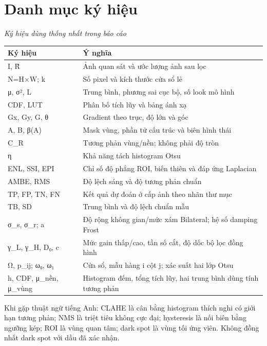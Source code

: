 \documentclass[13pt,a4paper]{extreport}
\begin{document}
\section*{Danh mục ký hiệu}
\noindent\textit{Ký hiệu dùng thống nhất trong báo cáo}
\begin{longtable}{p{7.3cm}|p{7.3cm}}
Ký hiệu & Ý nghĩa\\\hline
I, R̂ & Ảnh quan sát và ước lượng ảnh sau lọc\\\hline
N=H×W; k & Số pixel và kích thước cửa sổ lẻ\\\hline
μ, σ², L & Trung bình, phương sai cục bộ, số look mô hình\\\hline
CDF, LUT & Phân bố tích lũy và bảng ánh xạ\\\hline
Gx, Gy, G, θ & Gradient theo trục, độ lớn và góc\\\hline
A, B, β(A) & Mask vùng, phần tử cấu trúc và biên hình thái\\\hline
C\_R & Tương phản vùng/nền; không phải độ tròn\\\hline
η & Khả năng tách histogram Otsu\\\hline
ENL, SSI, EPI & Chỉ số độ phẳng ROI, biến thiên và đáp ứng Laplacian\\\hline
AMBE, RMS & Độ lệch sáng và độ tương phản chuẩn\\\hline
TP, FP, TN, FN & Kết quả dự đoán ở cấp ảnh theo nhãn thư mục\\\hline
TB, SD & Trung bình và độ lệch chuẩn mẫu\\\hline
σ\_s, σ\_r; a & Độ rộng không gian/mức xám Bilateral; hệ số damping Frost\\\hline
γ\_L, γ\_H, D₀, c & Mức gain thấp/cao, tần số cắt, độ dốc bộ lọc đồng hình\\\hline
Ω, p\_ij; ω₀, ω₁ & Cửa sổ, mẫu hàng i cột j; xác suất hai lớp Otsu\\\hline
h, CDF, μ\_nền, μ\_vùng & Histogram đếm, tổng tích lũy, hai trung bình dùng tính tương phản\\\hline
\end{longtable}
Khi gặp thuật ngữ tiếng Anh: CLAHE là cân bằng histogram thích nghi có giới hạn tương phản; NMS là triệt tiêu không cực đại; hysteresis là nối biên bằng ngưỡng kép; ROI là vùng quan tâm; dark spot là vùng tối ứng viên. Không đồng nhất dark spot với dầu đã xác nhận.
\par
\clearpage
\end{document}
